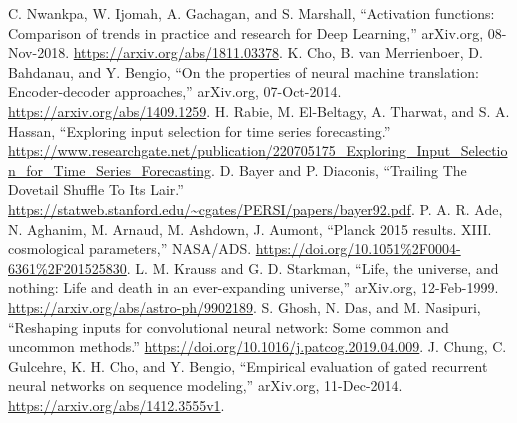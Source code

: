 \documentclass[conference]{IEEEtran}
\begin{document}
\begin{thebibliography}{00}
 C. Nwankpa, W. Ijomah, A. Gachagan, and S. Marshall, “Activation functions: Comparison of trends in practice and research for Deep Learning,” arXiv.org, 08-Nov-2018. \url{https://arxiv.org/abs/1811.03378}. 
 K. Cho, B. van Merrienboer, D. Bahdanau, and Y. Bengio, “On the properties of neural machine translation: Encoder-decoder approaches,” arXiv.org, 07-Oct-2014. \url{https://arxiv.org/abs/1409.1259}. 
 H. Rabie, M. El-Beltagy, A. Tharwat, and S. A. Hassan, “Exploring input selection for time series forecasting.” \url{https://www.researchgate.net/publication/220705175_Exploring_Input_Selection_for_Time_Series_Forecasting}. 
 D. Bayer and P. Diaconis, “Trailing The Dovetail Shuffle To Its Lair.” \url{https://statweb.stanford.edu/~cgates/PERSI/papers/bayer92.pdf}. 
 P. A. R. Ade, N. Aghanim, M. Arnaud, M. Ashdown, J. Aumont, “Planck 2015 results. XIII. cosmological parameters,” NASA/ADS. \url{https://doi.org/10.1051\%2F0004-6361\%2F201525830}. 
 L. M. Krauss and G. D. Starkman, “Life, the universe, and nothing: Life and death in an ever-expanding universe,” arXiv.org, 12-Feb-1999. \url{https://arxiv.org/abs/astro-ph/9902189}. 
 S. Ghosh, N. Das, and M. Nasipuri, “Reshaping inputs for convolutional neural network: Some common and uncommon methods.” \url{https://doi.org/10.1016/j.patcog.2019.04.009}. 
 J. Chung, C. Gulcehre, K. H. Cho, and Y. Bengio, “Empirical evaluation of gated recurrent neural networks on sequence modeling,” arXiv.org, 11-Dec-2014. \url{https://arxiv.org/abs/1412.3555v1}. 

\end{thebibliography}
\vspace{12pt}
\end{document}
